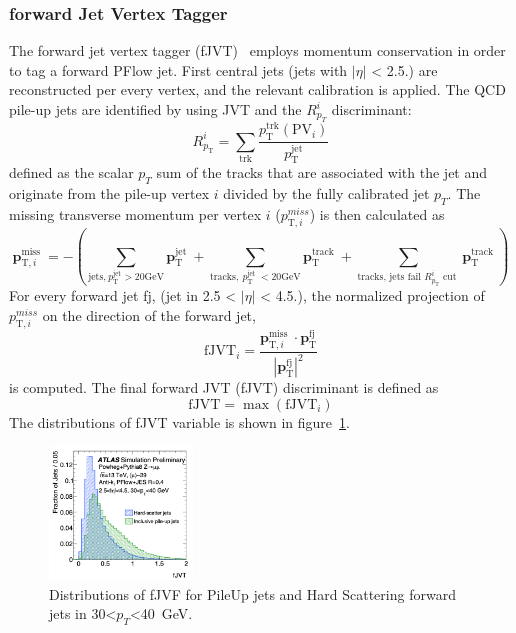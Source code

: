 \subsubsection{forward Jet Vertex Tagger}
The forward jet vertex tagger (fJVT)~\cite{PERF-2016-06} employs momentum conservation in order to tag a forward PFlow jet.
First central jets (jets with $|\eta|$ < 2.5.) are reconstructed per every vertex, and the relevant calibration is applied. 
The QCD pile-up jets are identified by using JVT and the $R^i_{p_T}$ discriminant:
\begin{equation}
R_{p_{\mathrm{T}}}^i=\sum_{\mathrm{trk}} \frac{p_{\mathrm{T}}^{\mathrm{trk}}\left(\mathrm{PV}_i\right)}{p_{\mathrm{T}}^{\mathrm{jet}}}
\end{equation}
defined as the scalar $p_T$ sum of the tracks that are associated with the jet and originate from the pile-up vertex $i$ divided by the fully calibrated jet $p_T$. 
The missing transverse momentum per vertex $i$ ($p^{miss}_{\mathrm{T},i}$) is then calculated as
\begin{equation}
\mathbf{p}_{\mathrm{T}, i}^{\text {miss }}=-\left(\sum_{\text{jets,}{~p_{\mathrm{T}}^{\text{jet}}>20\mathrm{GeV}}} \mathbf{p}_{\mathrm{T}}^{\text {jet }}+\sum_{\text {tracks},~p_{\mathrm{T}}^{\text {jet }}<20 \mathrm{GeV}} \mathbf{p}_{\mathrm{T}}^{\text {track }}+\sum_{\text {tracks, jets fail } R_{p_{\mathrm{T}}}^i \text { cut }} \mathbf{p}_{\mathrm{T}}^{\text {track }}\right)
\end{equation}
For every forward jet fj, (jet in 2.5 < $|\eta|$ < 4.5.), the normalized projection of $p^{miss}_{\mathrm{T},i}$ on the direction of the forward jet,
\begin{equation}
\mathrm{fJVT}_i=\frac{\mathbf{p}_{\mathrm{T}, i}^{\text {miss }} \cdot \mathbf{p}_{\mathrm{T}}^{\mathrm{fj}}}{\left|\mathbf{p}_{\mathrm{T}}^{\mathrm{fj}}\right|^2}
\end{equation}
is computed. The final forward JVT (fJVT) discriminant is defined as
\begin{equation}
\mathrm{fJVT}=\max \left(\mathrm{fJVT}_i\right)
\end{equation}
The distributions of fJVT variable is shown in figure~\ref{fig:fJVT}. 
\begin{figure}[tbp]
    \begin{center}
    \includegraphics[width=0.34\textwidth,keepaspectratio]{figures/Reconstruction/fJVT}
    \caption{
    Distributions of fJVF for PileUp jets and Hard Scattering forward jets in 30<$p_T$<40~GeV. \cite{PERF-2016-06}
    }
    \label{fig:fJVT}
    \end{center}
\end{figure}

